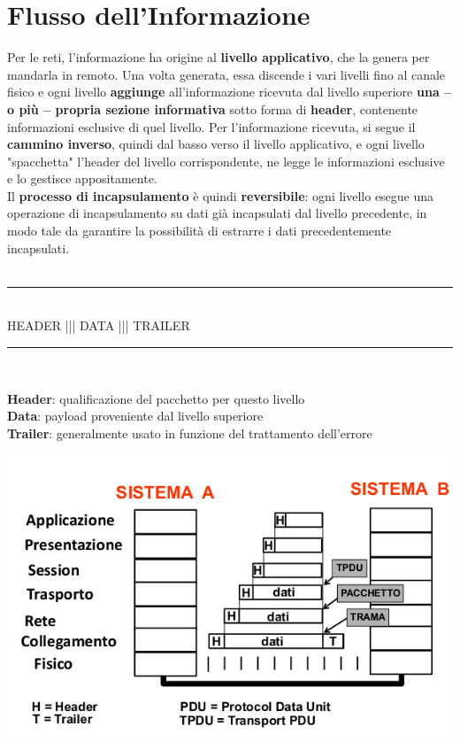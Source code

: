 \documentclass[10pt]{article}
\begin{document}
\section{Flusso dell'Informazione}
Per le reti, l'informazione ha origine al \textbf{livello applicativo}, che la genera per mandarla in remoto. Una volta generata, essa discende i vari livelli fino al canale fisico e ogni livello \textbf{aggiunge} all'informazione ricevuta dal livello superiore \textbf{una -- o più -- propria sezione informativa} sotto forma di \textbf{header}, contenente informazioni esclusive di quel livello. Per l'informazione ricevuta, si segue il \textbf{cammino inverso}, quindi dal basso verso il livello applicativo, e ogni livello "spacchetta" l'header del livello corrispondente, ne legge le informazioni esclusive e lo gestisce appositamente.\\Il \textbf{processo di incapsulamento} è quindi \textbf{reversibile}: ogni livello esegue una operazione di incapsulamento su dati già incapsulati dal livello precedente, in modo tale da garantire la possibilità di estrarre i dati precedentemente incapsulati.\\
\
\begin{center}
\rule{6.8cm}{1pt}\\
HEADER ||| DATA ||| TRAILER\\
\rule{6.8cm}{1pt}\\
\end{center}
\textbf{Header}: qualificazione del pacchetto per questo livello\\
\textbf{Data}: payload proveniente dal livello superiore\\
\textbf{Trailer}: generalmente usato in funzione del trattamento dell'errore\\
\begin{center}
\includegraphics[scale=0.75]{incapsulamento.png}
\end{center}
\pagebreak
\end{document}
